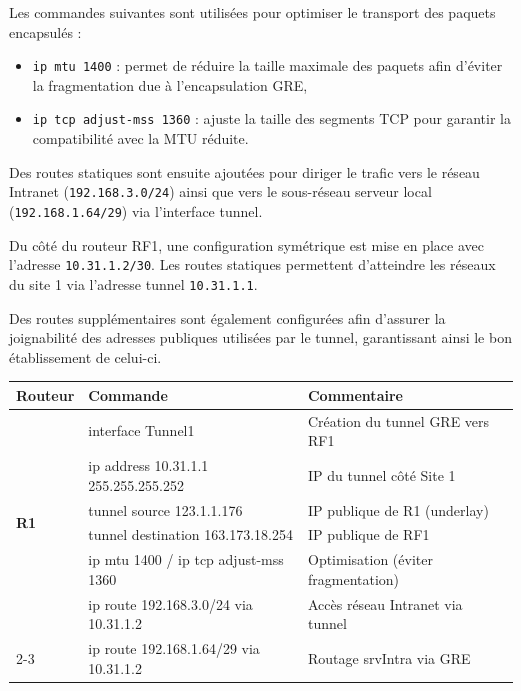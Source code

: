\documentclass[12pt,a4paper, oneside]{memoir}
\begin{document}
\begin{enumerate}
Les commandes suivantes sont utilisées pour optimiser le transport des paquets encapsulés :

\begin{itemize}
	\item \texttt{ip mtu 1400} : permet de réduire la taille maximale des paquets afin d’éviter la fragmentation due à l’encapsulation GRE,
	\item \texttt{ip tcp adjust-mss 1360} : ajuste la taille des segments TCP pour garantir la compatibilité avec la MTU réduite.
\end{itemize}

Des routes statiques sont ensuite ajoutées pour diriger le trafic vers le réseau Intranet (\texttt{192.168.3.0/24}) ainsi que vers le sous-réseau serveur local (\texttt{192.168.1.64/29}) via l’interface tunnel.

Du côté du routeur RF1, une configuration symétrique est mise en place avec l’adresse \texttt{10.31.1.2/30}. Les routes statiques permettent d’atteindre les réseaux du site 1 via l’adresse tunnel \texttt{10.31.1.1}.

Des routes supplémentaires sont également configurées afin d’assurer la joignabilité des adresses publiques utilisées par le tunnel, garantissant ainsi le bon établissement de celui-ci.


\begin{table}[H]
	\centering
	\renewcommand{\arraystretch}{1.3}
	\begin{tabular}{|p{2.5cm}|p{7cm}|p{6.5cm}|}
		\hline
		\textbf{Routeur} & \textbf{Commande} & \textbf{Commentaire} \\
		\hline
		
		\multirow{6}{*}{\textbf{R1}} 
		& interface Tunnel1 & Création du tunnel GRE vers RF1 \\
		& ip address 10.31.1.1 255.255.255.252 & IP du tunnel côté Site 1 \\
		& tunnel source 123.1.1.176 & IP publique de R1 (underlay) \\
		& tunnel destination 163.173.18.254 & IP publique de RF1 \\
		& ip mtu 1400 / ip tcp adjust-mss 1360 & Optimisation (éviter fragmentation) \\
		& ip route 192.168.3.0/24 via 10.31.1.2 & Accès réseau Intranet via tunnel \\
		\cline{2-3}
		& ip route 192.168.1.64/29 via 10.31.1.2 & Routage srvIntra via GRE \\
		\hline
		

\end{tabular}
\end{table}
\end{enumerate}
\end{document}

